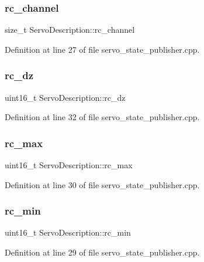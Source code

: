 \subsubsection{\texorpdfstring{rc\_channel}{rc\_channel}}
{\footnotesize\ttfamily size\+\_\+t Servo\+Description\+::rc\+\_\+channel}



Definition at line 27 of file servo\+\_\+state\+\_\+publisher.\+cpp.

\mbox{\label{classServoDescription_a769eb578d438192da7b6012c52686ba7}} 
\subsubsection{\texorpdfstring{rc\_dz}{rc\_dz}}
{\footnotesize\ttfamily uint16\+\_\+t Servo\+Description\+::rc\+\_\+dz}



Definition at line 32 of file servo\+\_\+state\+\_\+publisher.\+cpp.

\mbox{\label{classServoDescription_aff03b39826e42b6a5a1564fb15ee2b50}} 
\subsubsection{\texorpdfstring{rc\_max}{rc\_max}}
{\footnotesize\ttfamily uint16\+\_\+t Servo\+Description\+::rc\+\_\+max}



Definition at line 30 of file servo\+\_\+state\+\_\+publisher.\+cpp.

\mbox{\label{classServoDescription_add84ff84b13562dcc72fb2a7d7f05990}} 
\subsubsection{\texorpdfstring{rc\_min}{rc\_min}}
{\footnotesize\ttfamily uint16\+\_\+t Servo\+Description\+::rc\+\_\+min}



Definition at line 29 of file servo\+\_\+state\+\_\+publisher.\+cpp.


